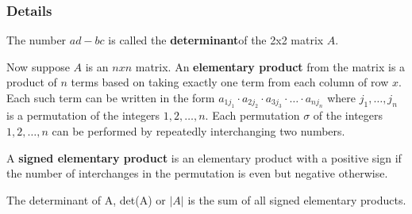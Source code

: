 \documentclass[12pt,a4paper]{article}
\theoremstyle{regla}
\theoremstyle{remark}
\theoremstyle{definition}
\theoremstyle{nonumberbreak}
\begin{document}
\subsubsection{Details}
\begin{defn}
The number $ad-bc$ is called the {\bf determinant}of the 2x2 matrix $A$.
\end{defn}
\begin{defn}
Now suppose $A$ is an $n x n$ matrix. An {\bf elementary product} from the matrix is a product of $n$ terms based on taking  exactly one term from each column of row $x$. Each such term can be written in the form 
$a_{1j_1} \cdot a_{2j_2} \cdot a_{3j_3} \cdot \ldots \cdot a_{nj_n}$
where $j_1, \ldots , j_n$ is a permutation of the integers $1,2, \ldots , n$. Each permutation $\sigma$ of the integers $1,2,\ldots,n$ can be performed by repeatedly interchanging two numbers. 
\end{defn}

\begin{defn}
A {\bf signed elementary product} is an elementary product with a positive sign if the number of interchanges in the permutation is even but negative otherwise.
\end{defn}

The determinant of A, det(A) or $\vert A \vert$ is the sum of all signed elementary products.
\end{document}

